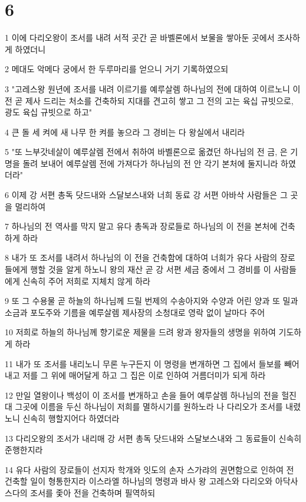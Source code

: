 \chapter{6}

\par 1 이에 다리오왕이 조서를 내려 서적 곳간 곧 바벨론에서 보물을 쌓아둔 곳에서 조사하게 하였더니
\par 2 메대도 악메다 궁에서 한 두루마리를 얻으니 거기 기록하였으되
\par 3 "고레스왕 원년에 조서를 내려 이르기를 예루살렘 하나님의 전에 대하여 이르노니 이 전 곧 제사 드리는 처소를 건축하되 지대를 견고히 쌓고 그 전의 고는 육십 규빗으로, 광도 육십 규빗으로 하고"
\par 4 큰 돌 세 켜에 새 나무 한 켜를 놓으라 그 경비는 다 왕실에서 내리라
\par 5 "또 느부갓네살이 예루살렘 전에서 취하여 바벨론으로 옮겼던 하나님의 전 금, 은 기명을 돌려 보내어 예루살렘 전에 가져다가 하나님의 전 안 각기 본처에 둘지니라 하였더라"
\par 6 이제 강 서편 총독 닷드내와 스달보스내와 너희 동료 강 서편 아바삭 사람들은 그 곳을 멀리하여
\par 7 하나님의 전 역사를 막지 말고 유다 총독과 장로들로 하나님의 이 전을 본처에 건축하게 하라
\par 8 내가 또 조서를 내려서 하나님의 이 전을 건축함에 대하여 너희가 유다 사람의 장로들에게 행할 것을 알게 하노니 왕의 재산 곧 강 서편 세금 중에서 그 경비를 이 사람들에게 신속히 주어 저희로 지체치 않게 하라
\par 9 또 그 수용물 곧 하늘의 하나님께 드릴 번제의 수송아지와 수양과 어린 양과 또 밀과 소금과 포도주와 기름을 예루살렘 제사장의 소청대로 영락 없이 날마다 주어
\par 10 저희로 하늘의 하나님께 향기로운 제물을 드려 왕과 왕자들의 생명을 위하여 기도하게 하라
\par 11 내가 또 조서를 내리노니 무론 누구든지 이 명령을 변개하면 그 집에서 들보를 빼어내고 저를 그 위에 매어달게 하고 그 집은 이로 인하여 거름더미가 되게 하라
\par 12 만일 열왕이나 백성이 이 조서를 변개하고 손을 들어 예루살렘 하나님의 전을 헐진대 그곳에 이름을 두신 하나님이 저희를 멸하시기를 원하노라 나 다리오가 조서를 내렸노니 신속히 행할지어다 하였더라
\par 13 다리오왕의 조서가 내리매 강 서편 총독 닷드내와 스달보스내와 그 동료들이 신속히 준행한지라
\par 14 유다 사람의 장로들이 선지자 학개와 잇도의 손자 스가랴의 권면함으로 인하여 전 건축할 일이 형통한지라 이스라엘 하나님의 명령과 바사 왕 고레스와 다리오와 아닥사스다의 조서를 좇아 전을 건축하며 필역하되
